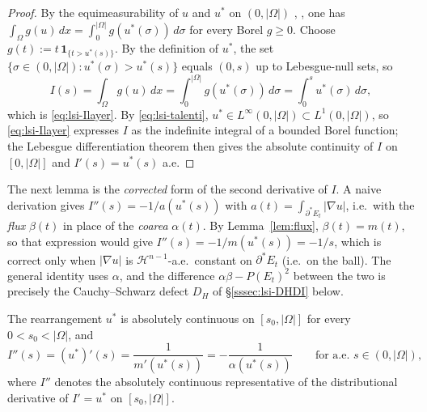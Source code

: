 \begin{proof}
By the equimeasurability of $u$ and $u^{*}$ on $(0,|\Omega|)$
\cite[\S 2]{KawohlBook}, \cite{Talenti1976}, one has
$\int_{\Omega}g(u)\,dx=\int_{0}^{|\Omega|}g(u^{*}(\sigma))\,d\sigma$ for
every Borel $g\ge 0$. Choose $g(t):=t\,\mathbf 1_{\{t>u^{*}(s)\}}$. By
the definition of $u^{*}$, the set $\{\sigma\in(0,|\Omega|):
u^{*}(\sigma)>u^{*}(s)\}$ equals $(0,s)$ up to Lebesgue-null sets, so
\[
   I(s)=\int_{\Omega}g(u)\,dx
       =\int_{0}^{|\Omega|}g(u^{*}(\sigma))\,d\sigma
       =\int_{0}^{s}u^{*}(\sigma)\,d\sigma,
\]
which is \eqref{eq:lsi-Ilayer}. By \eqref{eq:lsi-talenti}, $u^{*}\in
L^{\infty}(0,|\Omega|)\subset L^{1}(0,|\Omega|)$, so \eqref{eq:lsi-Ilayer}
expresses $I$ as the indefinite integral of a bounded Borel function;
the Lebesgue differentiation theorem then gives the absolute continuity
of $I$ on $[0,|\Omega|]$ and $I'(s)=u^{*}(s)$ a.e.
\end{proof}

The next lemma is the {\it corrected} form of the second derivative of
$I$. A naive derivation gives
$I''(s)=-1/a(u^{*}(s))$ with $a(t)=\int_{\partial^{*}E_{t}}|\nabla u|$,
i.e.\ with the {\it flux} $\beta(t)$ in place of the {\it coarea}
$\alpha(t)$. By Lemma~\ref{lem:flux}, $\beta(t)=m(t)$, so that
expression would give $I''(s)=-1/m(u^{*}(s))=-1/s$, which is correct
only when $|\nabla u|$ is $\mathcal H^{n-1}$-a.e.\ constant on
$\partial^{*}E_{t}$ (i.e.\ on the ball). The general identity uses
$\alpha$, and the difference $\alpha\beta-P(E_{t})^{2}$ between the two
is precisely the Cauchy--Schwarz defect $D_{H}$ of \S\ref{sssec:lsi-DHDI}
below.

\begin{lemma}\label{lem:Ipp}
The rearrangement $u^{*}$ is absolutely continuous on $[s_{0},|\Omega|]$
for every $0<s_{0}<|\Omega|$, and
\begin{equation}\label{eq:lsi-Ipp}
   I''(s)=(u^{*})'(s)
        =\frac{1}{m'(u^{*}(s))}
        =-\frac{1}{\alpha(u^{*}(s))}
   \qquad\text{for a.e.\ }s\in(0,|\Omega|),
\end{equation}
where $I''$ denotes the absolutely continuous representative of the
distributional derivative of $I'=u^{*}$ on $[s_{0},|\Omega|]$.
\end{lemma}

